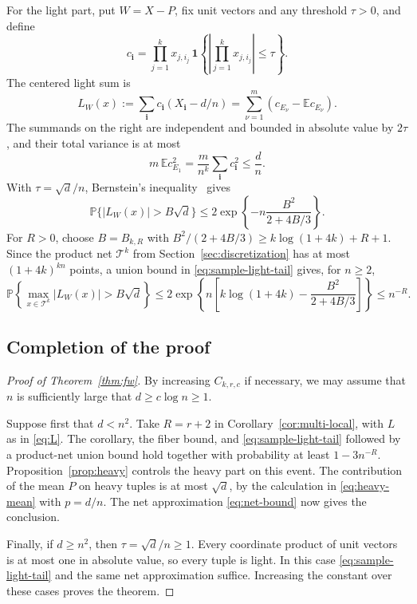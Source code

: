 \documentclass[11pt,reqno]{amsart}
\numberwithin{equation}{section}
\theoremstyle{definition}
\theoremstyle{remark}
\newcommand{\E}{\mathbb E}
\newcommand{\Pp}{\mathbb P}
\newcommand{\one}{\mathbf 1}
\begin{document}
For the light part, put $W=X-P$, fix unit vectors and any threshold
$\tau>0$, and define
\[
 c_{\mathbf i}=\prod_{j=1}^k x_{j,i_j}\,
                   \one\left\{\left|\prod_{j=1}^k x_{j,i_j}\right|
                                    \le\tau\right\}.
\]
The centered light sum is
\begin{equation}\label{eq:sample-light}
 L_W(x):=\sum_{\mathbf i}c_{\mathbf i}(X_{\mathbf i}-d/n)
 =\sum_{\nu=1}^m\left(c_{E_\nu}-\E c_{E_\nu}\right).
\end{equation}
The summands on the right are independent and bounded in absolute value by
$2\tau$, and their total variance is at most
\begin{equation}\label{eq:sample-variance}
 m\,\E c_{E_1}^2
 =\frac{m}{n^k}\sum_{\mathbf i}c_{\mathbf i}^2
 \le\frac dn.
\end{equation}
With $\tau=\sqrt d/n$, Bernstein's inequality~\cite[Theorem~2.9.5]{V26}
gives
\begin{equation}\label{eq:sample-light-tail}
 \Pp\{|L_W(x)|>B\sqrt d\}
 \le2\exp\left\{-n\frac{B^2}{2+4B/3}\right\}.
\end{equation}
For $R>0$, choose $B=B_{k,R}$ with
$B^2/(2+4B/3)\ge k\log(1+4k)+R+1$.
Since the product net $\mathcal T^k$ from Section~\ref{sec:discretization}
has at most $(1+4k)^{kn}$ points, a union bound in
\eqref{eq:sample-light-tail} gives, for $n\ge2$,
\[
 \Pp\left\{\max_{x\in\mathcal T^k}|L_W(x)|>B\sqrt d\right\}
 \le2\exp\left\{n\left[k\log(1+4k)-\frac{B^2}{2+4B/3}\right]\right\}
 \le n^{-R}.
\]

\subsection{Completion of the proof}

\begin{proof}[Proof of Theorem~\ref{thm:fw}]
By increasing $C_{k,r,c}$ if necessary, we may assume that $n$
is sufficiently large that $d\ge c\log n\ge1$.

Suppose first that $d<n^2$.
Take $R=r+2$ in
Corollary~\ref{cor:multi-local}, with $L$ as in \eqref{eq:L}.
The corollary, the fiber bound, and
\eqref{eq:sample-light-tail} followed by a product-net union bound
hold together with probability at least $1-3n^{-R}$.
Proposition~\ref{prop:heavy} controls the heavy part on this event.
The contribution of the mean $P$ on heavy tuples is at most
$\sqrt d$, by the calculation in \eqref{eq:heavy-mean} with $p=d/n$.
The net approximation \eqref{eq:net-bound} now gives the conclusion.

Finally, if $d\ge n^2$, then $\tau=\sqrt d/n\ge1$.
Every coordinate product of unit vectors is at most one in absolute
value, so every tuple is light. In this case
\eqref{eq:sample-light-tail} and the same net approximation suffice.
Increasing the constant over these cases proves the theorem.
\end{proof}
\end{document}
